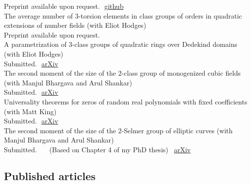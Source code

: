 \documentclass[11pt]{article} %
\begin{document}
Preprint available upon request.\,\, \textcolor[rgb]{0,0,1}{\href{https://github.com/ashvin-swaminathan/2-Selmer-statistics}{github}}\\
 The average number of $3$-torsion elements in class groups of orders in quadratic extensions of number fields (with Eliot Hodges)\\
Preprint available upon request.\\
 A parametrization of $3$-class groups of quadratic rings over Dedekind domains (with Eliot Hodges)\\
Submitted.\,\, \textcolor[rgb]{0,0,1}{\href{https://arxiv.org/pdf/2509.01722.pdf}{arXiv}} \\
 {The second moment of the size of the $2$-class group of monogenized cubic fields} (with Manjul Bhargava and Arul Shankar)\\
Submitted.\,\, \textcolor[rgb]{0,0,1}{\href{https://arxiv.org/pdf/2506.05539.pdf}{arXiv}}\\
 Universality theorems for zeros of random real polynomials with fixed coefficients (with Matt King) \\
Submitted.\,\, \textcolor[rgb]{0,0,1}{\href{https://arxiv.org/pdf/2409.02717.pdf}{arXiv}}\\
 {The second moment of the size of the $2$-Selmer group of elliptic curves} (with Manjul Bhargava and Arul Shankar)\\
Submitted.~~~ (Based on Chapter 4 of my PhD thesis)\,\,\, \textcolor[rgb]{0,0,1}{\href{https://arxiv.org/pdf/2110.09063.pdf}{arXiv}}

\subsection*{Published articles}
\end{document}

